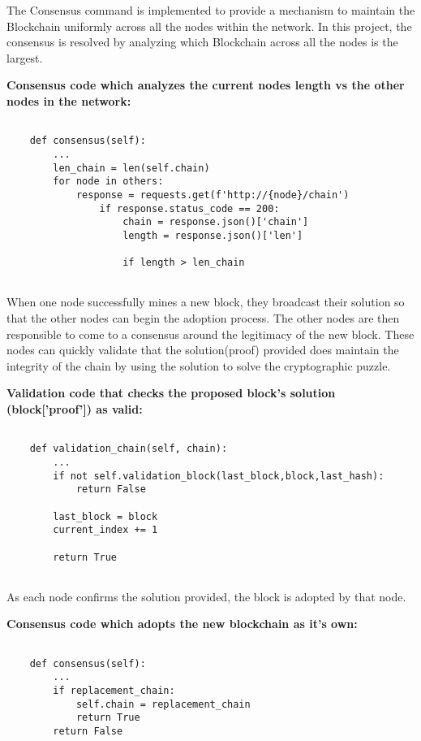 The Consensus command is implemented to provide a mechanism to
maintain the Blockchain uniformly across all the nodes within the
network. In this project, the consensus is resolved by analyzing which
Blockchain across all the nodes is the largest.

\bigskip
\noindent
\textbf{Consensus code which analyzes the current nodes length vs the other nodes in the
network:}
\begin{footnotesize}
\begin{verbatim}

    def consensus(self):
        ...
        len_chain = len(self.chain)
        for node in others:
            response = requests.get(f'http://{node}/chain')
                if response.status_code == 200:
                	chain = response.json()['chain']
                    length = response.json()['len']

                    if length > len_chain
            
\end{verbatim}
\end{footnotesize}
When one node successfully mines a new block, they broadcast their
solution so that the other nodes can begin the adoption process. The
other nodes are then responsible to come to a consensus around the
legitimacy of the new block. These nodes can quickly validate that the
solution(proof) provided does maintain the integrity of the chain by
using the solution to solve the cryptographic puzzle.

\bigskip
\noindent
\textbf{Validation code that checks the proposed block's solution
(\textbf{block['proof']}) as valid:}
\begin{footnotesize}
\begin{verbatim}

    def validation_chain(self, chain):
        ...
        if not self.validation_block(last_block,block,last_hash):
            return False

        last_block = block
        current_index += 1

        return True
	
\end{verbatim}
\end{footnotesize}
\bigskip
\noindent
As each node confirms the solution provided, the block is adopted by that node.

\bigskip
\noindent
\textbf{Consensus code which adopts the new blockchain 
as it's own:}
\begin{footnotesize}
\begin{verbatim}

    def consensus(self):
        ...
	    if replacement_chain:
            self.chain = replacement_chain
            return True
        return False
	
\end{verbatim}
\end{footnotesize}

